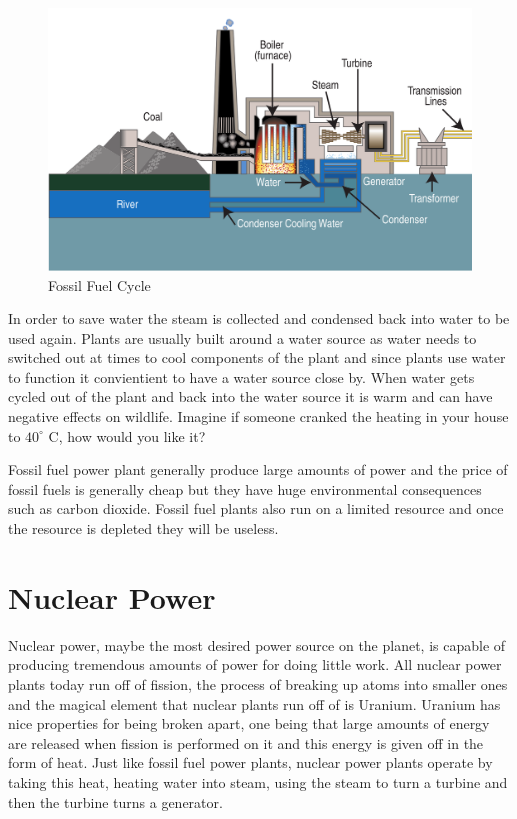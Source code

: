\documentclass[msc,oneside]{ubcthesis}%
\begin{document}
   \begin{figure}[hbt] \label{FossilFuelCycle} 
  \centering    
    \includegraphics[width=1\textwidth]{fossil_fuel}
    \caption[Fossil Fuel Cycle]{Fossil Fuel Cycle}  
    
\end{figure}

\newpage

In order to save water the steam is collected and condensed back into water to be used again. Plants are 
usually built around a water source as water needs to switched out at times to cool components of the plant 
and since plants use water to function it convientient to have a water source close by.
 When water gets cycled out of the plant and back into the water source it is warm and can have negative 
 effects on wildlife. Imagine if someone cranked the heating in your house to $40^\circ$ C, how would you 
 like it?

Fossil fuel power plant generally produce large amounts of power and the price of fossil fuels is generally 
cheap but they have huge environmental consequences such as carbon dioxide. Fossil fuel plants also run on 
a limited resource and once the resource is depleted they will be useless.

 \section{Nuclear Power}

 Nuclear power,  maybe the most desired power source on the planet, is capable of producing tremendous 
 amounts of power for doing little work. All nuclear power plants today run off of fission, the process of 
 breaking up atoms into smaller ones and the magical element that nuclear plants run off of is Uranium. 
 Uranium has nice properties for being broken apart, one being that large amounts of energy are released 
 when fission is performed on it and this energy is given off in the form of heat. Just like fossil fuel 
 power plants, nuclear power plants operate by taking this heat, heating water into steam, using the steam 
 to turn a turbine and then the turbine turns a generator.
\end{document}
